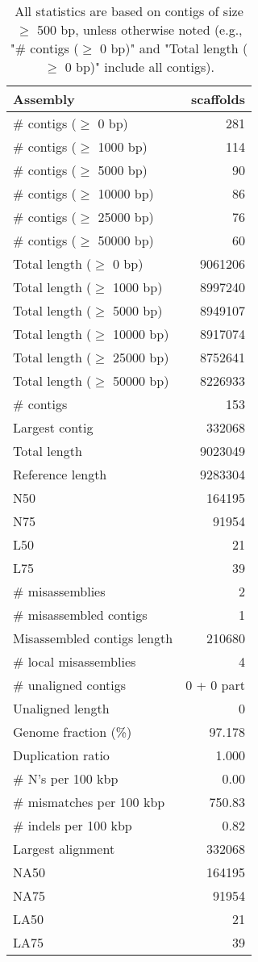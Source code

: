 \documentclass[12pt,a4paper]{article}
\begin{document}
\begin{table}[ht]
\begin{center}
\caption{All statistics are based on contigs of size $\geq$ 500 bp, unless otherwise noted (e.g., "\# contigs ($\geq$ 0 bp)" and "Total length ($\geq$ 0 bp)" include all contigs).}
\begin{tabular}{|l*{1}{|r}|}
\hline
Assembly & scaffolds \\ \hline
\# contigs ($\geq$ 0 bp) & 281 \\ \hline
\# contigs ($\geq$ 1000 bp) & 114 \\ \hline
\# contigs ($\geq$ 5000 bp) & 90 \\ \hline
\# contigs ($\geq$ 10000 bp) & 86 \\ \hline
\# contigs ($\geq$ 25000 bp) & 76 \\ \hline
\# contigs ($\geq$ 50000 bp) & 60 \\ \hline
Total length ($\geq$ 0 bp) & 9061206 \\ \hline
Total length ($\geq$ 1000 bp) & 8997240 \\ \hline
Total length ($\geq$ 5000 bp) & 8949107 \\ \hline
Total length ($\geq$ 10000 bp) & 8917074 \\ \hline
Total length ($\geq$ 25000 bp) & 8752641 \\ \hline
Total length ($\geq$ 50000 bp) & 8226933 \\ \hline
\# contigs & 153 \\ \hline
Largest contig & 332068 \\ \hline
Total length & 9023049 \\ \hline
Reference length & 9283304 \\ \hline
N50 & 164195 \\ \hline
N75 & 91954 \\ \hline
L50 & 21 \\ \hline
L75 & 39 \\ \hline
\# misassemblies & 2 \\ \hline
\# misassembled contigs & 1 \\ \hline
Misassembled contigs length & 210680 \\ \hline
\# local misassemblies & 4 \\ \hline
\# unaligned contigs & 0 + 0 part \\ \hline
Unaligned length & 0 \\ \hline
Genome fraction (\%) & 97.178 \\ \hline
Duplication ratio & 1.000 \\ \hline
\# N's per 100 kbp & 0.00 \\ \hline
\# mismatches per 100 kbp & 750.83 \\ \hline
\# indels per 100 kbp & 0.82 \\ \hline
Largest alignment & 332068 \\ \hline
NA50 & 164195 \\ \hline
NA75 & 91954 \\ \hline
LA50 & 21 \\ \hline
LA75 & 39 \\ \hline
\end{tabular}
\end{center}
\end{table}
\end{document}
